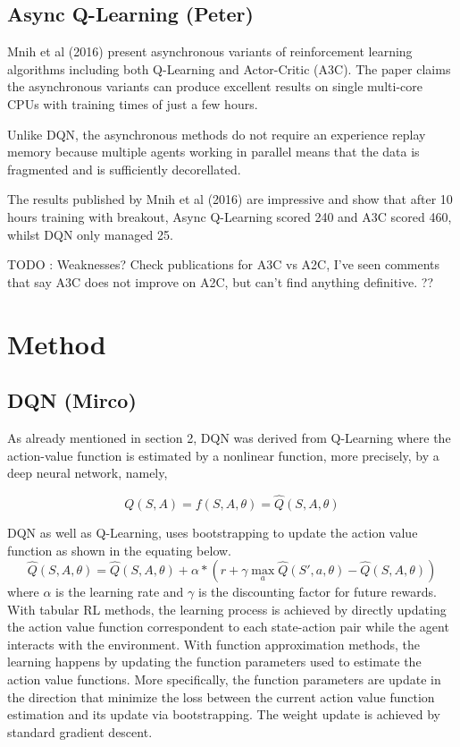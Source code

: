 \documentclass{article}
\begin{document}
\subsection{Async Q-Learning (Peter)}

Mnih et al (2016) present asynchronous variants of reinforcement learning algorithms including both Q-Learning and Actor-Critic (A3C).
The paper claims the asynchronous variants can produce excellent results on single multi-core CPUs with training times of just a few hours.

Unlike DQN, the asynchronous methods do not require an experience replay memory because multiple agents working in parallel means that the data is fragmented and is sufficiently decorellated.

The results published by Mnih et al (2016) are impressive and show that after 10 hours training with breakout, Async Q-Learning scored 240 and A3C scored 460, whilst DQN only managed 25.

TODO : Weaknesses? Check publications for A3C vs A2C, I've seen comments that say A3C does not improve on A2C, but can't find anything definitive. ??


\section{Method}
\subsection{DQN (Mirco)}

As already mentioned in section 2, DQN was derived from Q-Learning where the action-value function is estimated by a nonlinear function, more precisely, by a deep neural network, namely,

\begin{equation}
Q(S,A) = f(S,A,\theta) = \hat{Q}(S,A,\theta)
\end{equation}

DQN as well as Q-Learning, uses bootstrapping to update the action value function as shown in the equating below. 
\begin{equation}
\hat{Q}(S,A,\theta) = \hat{Q}(S,A,\theta) + \alpha * \left( r + \gamma \max_{a} \hat{Q}(S',a,\theta) - \hat{Q}(S,A,\theta) \right)
\end{equation}
where $\alpha$ is the learning rate and $\gamma$ is the discounting factor for future rewards.
With tabular RL methods, the learning process is achieved by directly updating the action value function correspondent to each state-action pair while the agent interacts with the environment. With function approximation methods, the learning happens by updating the function parameters used to estimate the action value functions.
More specifically, the function parameters are update in the direction that minimize the loss between the current action value function estimation and its update via bootstrapping. The weight update is achieved by standard gradient descent.
\end{document}
